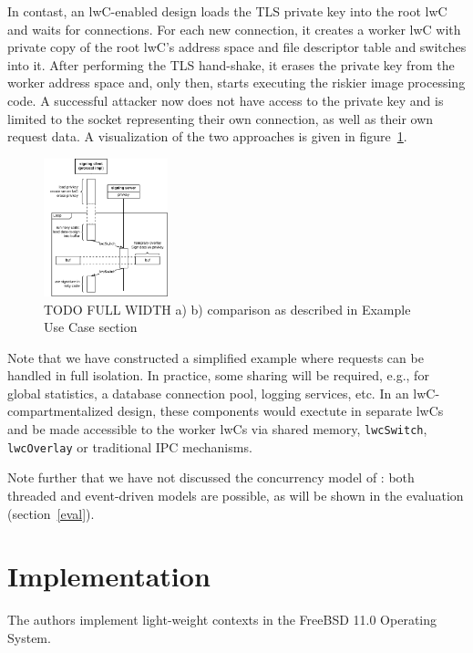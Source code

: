 \documentclass[10pt,twocolumn,letter]{article}
\begin{document}
In contast, an lwC-enabled design loads the TLS private key into the root lwC and waits for connections.
For each new connection, it creates a worker lwC with private copy of the root lwC's address space and file descriptor table and switches into it.
After performing the TLS hand-shake, it erases the private key from the worker address space and, only then, starts executing the riskier image processing code.
A successful attacker now does not have access to the private key and is limited to the socket representing their own connection, as well as their own request data.
A visualization of the two approaches is given in figure~\ref{design:usage:apparchpost}.

\begin{figure}
  \label{design:usage:apparchpre}
  \label{design:usage:apparchpost}
  \centering
  \includegraphics[height=4cm]{fig/encryption-compartment}
  \caption{
    TODO FULL WIDTH a)  b) comparison as described in Example Use Case section
  }
\end{figure}

Note that we have constructed a simplified example where requests can be handled in full isolation.
In practice, some sharing will be required, e.g., for global statistics, a database connection pool, logging services, etc.
In an lwC-compartmentalized design, these components would exectute in separate lwCs and be made accessible to the worker lwCs via shared memory, \lstinline{lwcSwitch}, \lstinline{lwcOverlay} or traditional IPC mechanisms.

Note further that we have not discussed the concurrency model of \appname: both threaded and event-driven models are possible, as will be shown in the evaluation (section~\ref{eval}).


\section{Implementation}\label{impl}

The authors implement light-weight contexts in the FreeBSD 11.0 Operating System.

\end{document}
